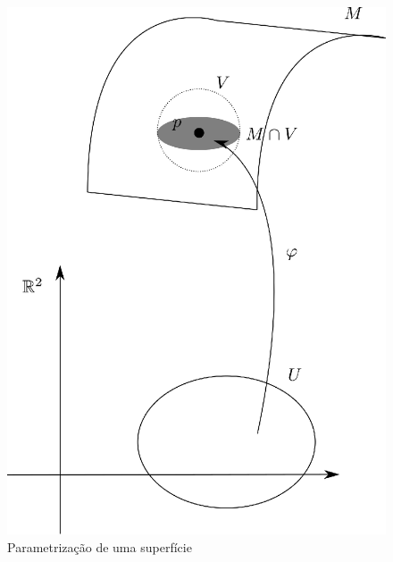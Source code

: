 \begin{figure}
	\centering
	
%	
%	
%	
%	
%	
%	
	\includegraphics[scale=0.5]{graficos/parametrizacao.eps}
	\caption{Parametrização de uma superfície}
\end{figure}

